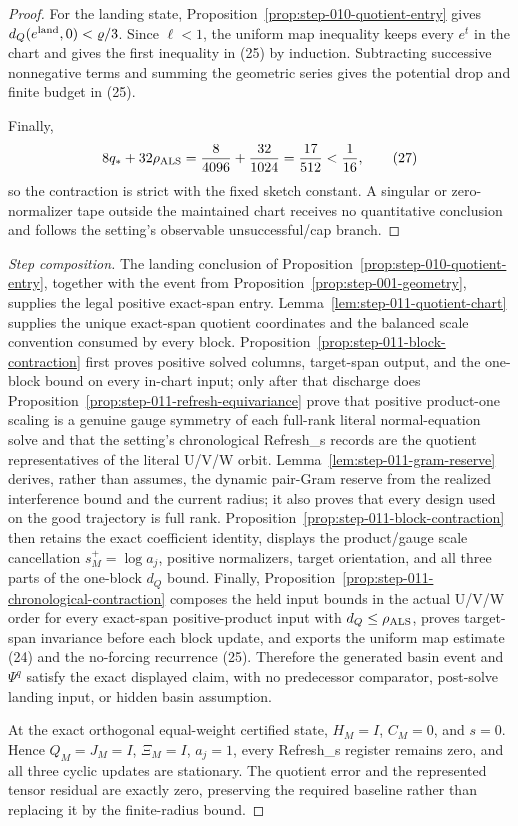 \begin{proposition}
\begin{proof}
For the landing state, Proposition~\ref{prop:step-010-quotient-entry} gives
\(d_Q(e^{\rm land},0)<\varrho/3\). Since \(\ell<1\), the uniform map
inequality keeps every \(e^t\) in the chart and gives the first inequality
in (25) by induction. Subtracting successive nonnegative terms and summing
the geometric series gives the potential drop and finite budget in (25).

Finally,
\[
 8q_*+32\rho_{\rm ALS}
 ={8\over4096}+{32\over1024}
 ={17\over512}< {1\over16},
\tag{27}
\]
so the contraction is strict with the fixed sketch constant. A singular or
zero-normalizer tape outside the maintained chart receives no quantitative
conclusion and follows the setting's observable unsuccessful/cap branch.

\end{proof}
\end{proposition}
\begin{proof}[Step composition]
The landing conclusion of Proposition~\ref{prop:step-010-quotient-entry},
together with the event from Proposition~\ref{prop:step-001-geometry},
supplies the legal positive exact-span entry.
Lemma~\ref{lem:step-011-quotient-chart} supplies the unique exact-span
quotient coordinates and the balanced scale convention consumed by every
block. Proposition~\ref{prop:step-011-block-contraction} first proves
positive solved columns, target-span output, and the one-block bound on every
in-chart input; only after that discharge does
Proposition~\ref{prop:step-011-refresh-equivariance} prove that
positive product-one scaling is a genuine gauge symmetry of each full-rank
literal normal-equation solve and that the setting's chronological
Refresh\_s records are the quotient representatives of the literal U/V/W
orbit. Lemma~\ref{lem:step-011-gram-reserve} derives, rather than assumes,
the dynamic pair-Gram reserve from the realized interference bound
and the current radius; it also proves that every design used on the good
trajectory is full rank. Proposition~\ref{prop:step-011-block-contraction}
then retains the exact coefficient identity, displays the product/gauge
scale cancellation
\(s_M^+=\log a_j\), positive normalizers, target orientation, and all three
parts of the one-block \(d_Q\) bound. Finally,
Proposition~\ref{prop:step-011-chronological-contraction} composes the held
input bounds in the actual U/V/W order for every exact-span positive-product
input with \(d_Q\le\rho_{\rm ALS}\), proves target-span invariance before
each block update, and exports the uniform map estimate (24) and the
no-forcing recurrence (25). Therefore the generated basin event and
\(\Psi^q\) satisfy the exact displayed claim, with no predecessor
comparator, post-solve landing input, or hidden basin assumption.

At the exact orthogonal equal-weight certified state,
\(H_M=I\), \(C_M=0\), and \(s=0\). Hence \(Q_M=J_M=I\),
\(\Xi_M=I\), \(a_j=1\), every Refresh\_s register remains zero, and all
three cyclic updates are stationary. The quotient error and the represented
tensor residual are exactly zero, preserving the required baseline rather
than replacing it by the finite-radius bound.
\end{proof}

